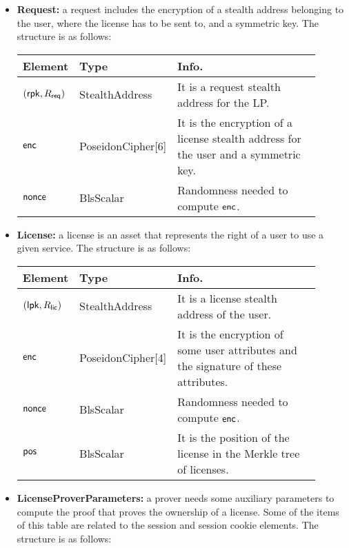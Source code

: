 \begin{itemize}
    \item \textbf{Request:} a request includes the encryption of a stealth address belonging to the user, where the license has to be sent to, and a symmetric key. The structure is as follows:

    \begin{center}
        \begin{tabular}{ | p{0.15\linewidth} | p{0.2\linewidth} | p{0.55\linewidth} | } 
        \hline
        \textbf{Element} & \textbf{Type} & \textbf{Info.} \\
        \hline
        $(\mathsf{rpk}, R_{\mathsf{req}})$ & StealthAddress & It is a request stealth address for the LP. \\
        $\mathsf{enc}$ & PoseidonCipher[6] & It is the encryption of a license stealth address for the user and a symmetric key. \\
        $\mathsf{nonce}$ & BlsScalar & Randomness needed to compute $\mathsf{enc}$. \\ 
        \hline
        \end{tabular}
    \end{center}

    \item \textbf{License:} a license is an asset that represents the right of a user to use a given service. The structure is as follows:

    \begin{center}
        \begin{tabular}{ | p{0.15\linewidth} | p{0.2\linewidth} | p{0.55\linewidth} | } 
        \hline
        \textbf{Element} & \textbf{Type} & \textbf{Info.} \\
        \hline
        $(\mathsf{lpk}, R_{\mathsf{lic}})$ & StealthAddress & It is a license stealth address of the user. \\
        $\mathsf{enc}$ & PoseidonCipher[4] & It is the encryption of some user attributes and the signature of these attributes. \\
        $\mathsf{nonce}$ & BlsScalar & Randomness needed to compute $\mathsf{enc}$. \\ 
        $\mathsf{pos}$ & BlsScalar & It is the position of the license in the Merkle tree of licenses. \\ 
        \hline
        \end{tabular}
    \end{center}

    \item \textbf{LicenseProverParameters:} a prover needs some auxiliary parameters to compute the proof that proves the ownership of a license. Some of the items of this table are related to the session and session cookie elements. The structure is as follows:


\end{itemize}

